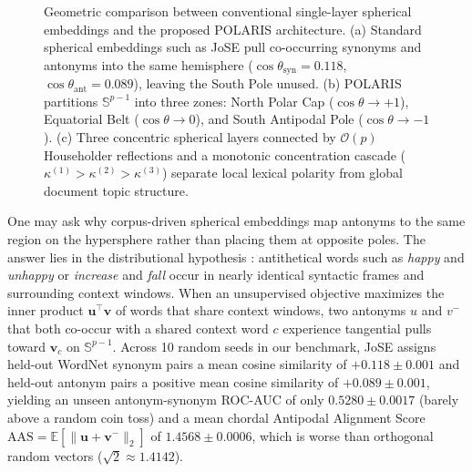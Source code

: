 \documentclass[journal]{IEEEtran}
\begin{document}
\begin{figure}[!t]
{%
}
\caption{Geometric comparison between conventional single-layer spherical embeddings and the proposed POLARIS architecture. (a) Standard spherical embeddings such as JoSE pull co-occurring synonyms and antonyms into the same hemisphere ($\cos\theta_{\text{syn}} = 0.118$, $\cos\theta_{\text{ant}} = 0.089$), leaving the South Pole unused. (b) POLARIS partitions $\mathbb{S}^{p-1}$ into three zones: North Polar Cap ($\cos\theta \to +1$), Equatorial Belt ($\cos\theta \to 0$), and South Antipodal Pole ($\cos\theta \to -1$). (c) Three concentric spherical layers connected by $\mathcal{O}(p)$ Householder reflections and a monotonic concentration cascade ($\kappa^{(1)} > \kappa^{(2)} > \kappa^{(3)}$) separate local lexical polarity from global document topic structure.}
\label{fig:polaris_hook}
\end{figure}

One may ask why corpus-driven spherical embeddings map antonyms to the same region on the hypersphere rather than placing them at opposite poles. The answer lies in the distributional hypothesis \cite{harris1954distributional}: antithetical words such as \textit{happy} and \textit{unhappy} or \textit{increase} and \textit{fall} occur in nearly identical syntactic frames and surrounding context windows. When an unsupervised objective maximizes the inner product $\mathbf{u}^\top \mathbf{v}$ of words that share context windows, two antonyms $u$ and $v^-$ that both co-occur with a shared context word $c$ experience tangential pulls toward $\mathbf{v}_c$ on $\mathbb{S}^{p-1}$. Across 10 random seeds in our benchmark, JoSE assigns held-out WordNet synonym pairs a mean cosine similarity of $+0.118 \pm 0.001$ and held-out antonym pairs a positive mean cosine similarity of $+0.089 \pm 0.001$, yielding an unseen antonym-synonym ROC-AUC of only $0.5280 \pm 0.0017$ (barely above a random coin toss) and a mean chordal Antipodal Alignment Score $\text{AAS} = \mathbb{E}[\|\mathbf{u} + \mathbf{v}^-\|_2]$ of $1.4568 \pm 0.0006$, which is worse than orthogonal random vectors ($\sqrt{2} \approx 1.4142$).
\end{document}
